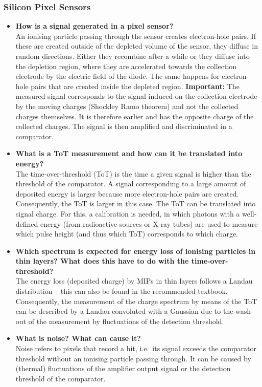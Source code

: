 \documentclass[a4paper,11pt]{article}
\begin{document}
\subsubsection{Silicon Pixel Sensors}
\begin{itemize}
\item \textbf{How is a signal generated in a pixel sensor?}\\
An ionising particle passing through the sensor creates electron-hole pairs.
If these are created outside of the depleted volume of the sensor, they diffuse in random directions.
Either they recombine after a while or they diffuse into the depletion region, where they are accelerated towards the collection electrode by the electric field of the diode.
The same happens for electron-hole pairs that are created inside the depleted region.
\textbf{Important:} The measured signal corresponds to the signal induced on the collection electrode by the moving charges (Shockley Ramo theorem) and not the collected charges themselves.
It is therefore earlier and has the opposite charge of the collected charges.
The signal is then amplified and discriminated in a comparator.
\item \textbf{What is a ToT measurement and how can it be translated into energy?}\\
The time-over-threshold (ToT) is the time a given signal is higher than the threshold of the comparator.
A signal corresponding to a large amount of deposited energy is larger because more electron-hole pairs are created. 
Consequently, the ToT is larger in this case.
The ToT can be translated into signal charge.
For this, a calibration is needed, in which photons with a well-defined energy (from radioactive sources or X-ray tubes) are used to measure which pulse height (and thus which ToT) corresponds to which charge.
\item \textbf{Which spectrum is expected for energy loss of ionising particles in thin layers? What does this have to do with the time-over-threshold?}\\
The energy loss (deposited charge) by MIPs in thin layers follows a Landau distribution -- this can also be found in the recommended textbook.
Consequently, the measurement of the charge spectrum by means of the ToT can be described by a Landau convoluted with a Gaussian due to the wash-out of the measurement by fluctuations of the detection threshold.
\item \textbf{What is noise? What can cause it?}\\
Noise refers to pixels that record a hit, i.e.~its signal exceeds the comparator threshold without an ionising particle passing through.
It can be caused by (thermal) fluctuations of the amplifier output signal or the detection threshold of the comparator.
\end{itemize}
\end{document}
